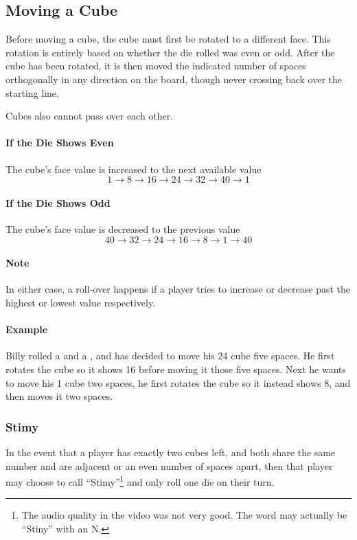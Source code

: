 \subsection{Moving a Cube}
Before moving a cube, the cube must first be rotated to a different face.
This rotation is entirely based on whether the die rolled was even or odd.
After the cube has been rotated, it is then moved the indicated number of spaces orthogonally in any direction on the board, though never crossing back over the starting line.

Cubes also cannot pass over each other.

\paragraph{If the Die Shows Even} The cube's face value is increased to the next available value
$$1 \to 8 \to 16 \to 24 \to 32 \to 40 \to 1$$
\paragraph{If the Die Shows Odd} The cube's face value is decreased to the previous value
$$40 \to 32 \to 24 \to 16 \to 8 \to 1 \to 40$$

\paragraph{Note} In either case, a roll-over happens if a player tries to increase or decrease past the highest or lowest value respectively.

\paragraph{Example} Billy rolled a  and a , and has decided to move his 24 cube five spaces. He first rotates the cube so it shows 16 before moving it those five spaces. Next he wants to move his 1 cube two spaces, he first rotates the cube so it instead shows 8, and then moves it two spaces.

\subsubsection{Stimy}
In the event that a player has exactly two cubes left, and both share the same number and are adjacent or an even number of spaces apart, then that player may choose to call ``Stimy''\footnote{The audio quality in the video was not very good. The word may actually be ``Stiny'' with an N.} and only roll one die on their turn.